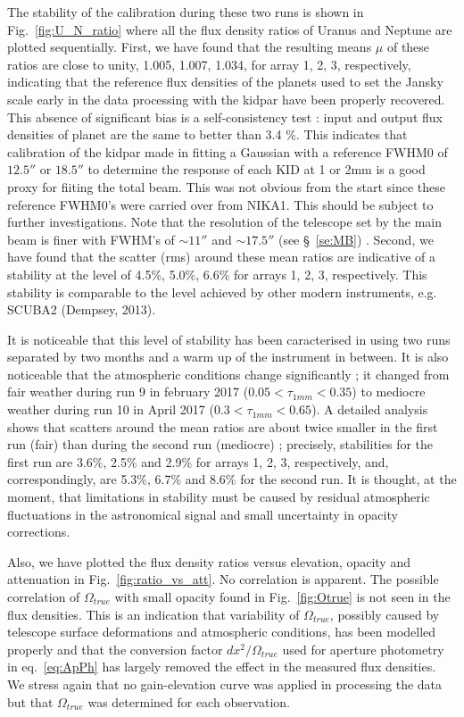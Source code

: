 The stability of the calibration during these two runs 
is shown  in  Fig.~\ref{fig:U_N_ratio}  where all the flux density ratios of Uranus and Neptune are
plotted sequentially.
First, we have found that the resulting means $\mu$ of these ratios are close to unity,  1.005, 1.007, 1.034, for array 1, 2, 3, respectively,
indicating that the  reference flux densities of the planets used to set the Jansky scale 
early in the data processing with the kidpar have been properly
recovered. This absence of significant bias is a  self-consistency test : 
input and output flux densities of planet are the same to better than 3.4 \%. 
This indicates that calibration of  the kidpar  made in
fitting a Gaussian with a reference FWHM0 of $12.5''$ or $18.5''$ 
to determine the response of each KID at 1 or 2mm is a good proxy for
fiiting the total beam. This was not obvious from the start since these
reference FWHM0's were carried over from NIKA1. This should be subject
to further investigations. Note that the resolution of the telescope set by the main
beam is finer with FWHM's of $\sim 11''$ and $\sim 17.5''$ (see
\S~\ref{se:MB}) .
Second, we have found  that  the scatter (rms) around these mean ratios are indicative of
a stability at the level of 4.5\%, 5.0\%, 6.6\% for arrays 1, 2, 3,
respectively. This stability is comparable to the level achieved by other modern instruments,
e.g. SCUBA2 (Dempsey, 2013).

It is noticeable that this level of stability has been caracterised  in using two runs
separated by two months and  a warm up of the instrument in between. It is also noticeable that the
atmospheric conditions change significantly ; it changed from fair weather during run 9 in february 2017
($0.05 < \tau_{1mm} < 0.35$) to mediocre weather during run 10 in April 2017 ($0.3 < \tau_{1mm} < 0.65$). 
A detailed analysis shows that scatters around the  mean ratios 
are about twice smaller in the first run (fair) than during the second run (mediocre) ;
precisely, stabilities for the first run
are 3.6\%, 2.5\% and 2.9\% for arrays 1, 2, 3, respectively,
and, correspondingly,  are  5.3\%, 6.7\% and 8.6\% for the second run.
It is thought, at the moment, that limitations in stability must be  caused by residual atmospheric fluctuations
in the astronomical signal and small uncertainty in opacity corrections.

Also, we have plotted the flux density ratios versus elevation, opacity and attenuation in  Fig.~\ref{fig:ratio_vs_att}.
No correlation is apparent. The possible correlation of $\Omega_{true}$ with small opacity found in Fig.~\ref{fig:Otrue}
is not seen in the flux densities. This is an indication that variability of $\Omega_{true}$, possibly 
caused by telescope surface deformations and atmospheric conditions,
has been modelled properly and  that the conversion factor
$dx^2/\Omega_{true}$ used for aperture photometry in eq.~\ref{eq:ApPh}
has largely removed the effect in the measured flux densities. 
We stress again that no gain-elevation curve was applied
in processing the data but that  $\Omega_{true}$ was determined for each observation.

